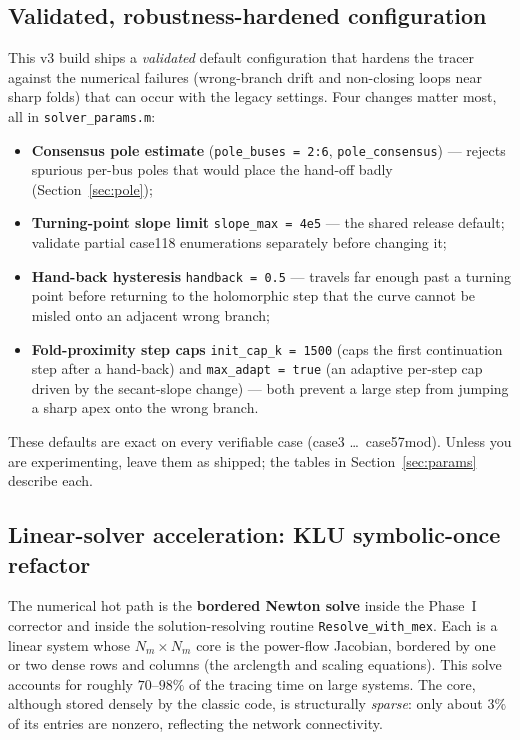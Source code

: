 \documentclass[11pt,a4paper]{article}
\newcommand{\code}[1]{\texttt{#1}}
\begin{document}
\subsection{Validated, robustness-hardened configuration}\label{sec:tuned}
This v3 build ships a \emph{validated} default configuration that hardens the tracer
against the numerical failures (wrong-branch drift and non-closing loops near sharp folds)
that can occur with the legacy settings. Four changes matter most, all in
\code{solver_params.m}:
\begin{itemize}[leftmargin=1.4em]
  \item \textbf{Consensus pole estimate} (\code{pole_buses = 2:6}, \code{pole_consensus})
        --- rejects spurious per-bus poles that would place the hand-off badly
        (Section~\ref{sec:pole});
  \item \textbf{Turning-point slope limit} \code{slope_max = 4e5} --- the shared
        release default; validate partial case118 enumerations separately before changing it;
  \item \textbf{Hand-back hysteresis} \code{handback = 0.5} --- travels far enough past a
        turning point before returning to the holomorphic step that the curve cannot be
        misled onto an adjacent wrong branch;
  \item \textbf{Fold-proximity step caps} \code{init_cap_k = 1500} (caps the first
        continuation step after a hand-back) and \code{max_adapt = true} (an adaptive
        per-step cap driven by the secant-slope change) --- both prevent a large step from
        jumping a sharp apex onto the wrong branch.
\end{itemize}
These defaults are exact on every verifiable case (case3 \dots\ case57mod). Unless you are
experimenting, leave them as shipped; the tables in Section~\ref{sec:params} describe each.

\subsection{Linear-solver acceleration: KLU symbolic-once refactor}\label{sec:klu}
The numerical hot path is the \textbf{bordered Newton solve} inside the Phase~I corrector
and inside the solution-resolving routine \code{Resolve_with_mex}. Each is a linear system
whose $N_m\times N_m$ core is the power-flow Jacobian, bordered by one or two dense rows and
columns (the arclength and scaling equations). This solve accounts for roughly
$70$--$98\%$ of the tracing time on large systems. The core, although stored densely by the
classic code, is structurally \emph{sparse}: only about $3\%$ of its entries are nonzero,
reflecting the network connectivity.
\end{document}
